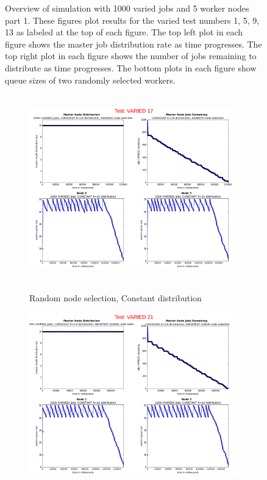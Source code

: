 \documentclass{article}
\begin{document}
\begin{figure}
  
  \caption{Overview of simulation with 1000 varied jobs and 5 worker nodes part 1. These figures plot results for the varied test numbers 1, 5, 9, 13 as labeled at the top of each figure. The top left plot in each figure shows the master job distribution rate as time progresses. The top right plot in each figure shows the number of jobs remaining to distribute as time progresses. The bottom plots in each figure show queue sizes of two randomly selected workers.}
  \label{testVaried1-13} 
  
\end{figure}

\begin{figure}[p] 
  \begin{subfigure}[b]{0.5\linewidth}
    \centering
    \hbox{\hspace{-5.0em} \includegraphics[width=1.2\linewidth]{combined_varied_overview/case_varied_17} }
    \caption{Random node selection, Constant distribution}
    \label{testVaried17} 
    \vspace{4ex}
  \end{subfigure}%
  \begin{subfigure}[b]{0.5\linewidth}
    \centering
    \includegraphics[width=1.2\linewidth]{combined_varied_overview/case_varied_21} 

\end{subfigure}
\end{figure}
\end{document}

